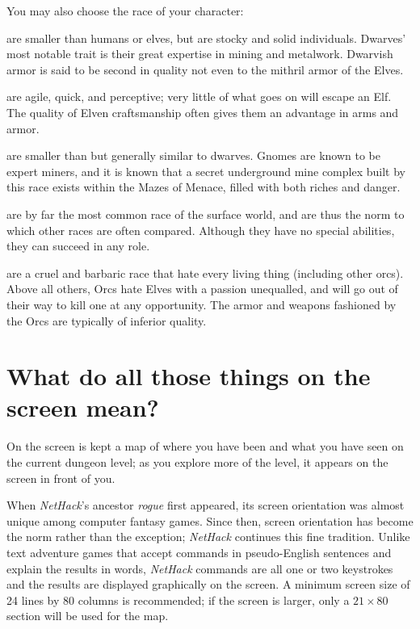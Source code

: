 You may also choose the race of your character:

%
\blist{}
\item[\bb{Dwarves}]%
are smaller than humans or elves, but are stocky and solid
individuals.  Dwarves' most notable trait is their great expertise in mining
and metalwork.  Dwarvish armor is said to be second in quality not even to the
mithril armor of the Elves.
%
\item[\bb{Elves}]%
are agile, quick, and perceptive; very little of what goes
on will escape an Elf.  The quality of Elven craftsmanship often gives
them an advantage in arms and armor.
%
\item[\bb{Gnomes}]%
are smaller than but generally similar to dwarves.  Gnomes are
known to be expert miners, and it is known that a secret underground mine
complex built by this race exists within the Mazes of Menace, filled with
both riches and danger.
%
\item[\bb{Humans}]%
are by far the most common race of the surface world, and
are thus the norm to which other races are often compared.  Although
they have no special abilities, they can succeed in any role.
%
\item[\bb{Orcs}]%
are a cruel and barbaric race that hate every living thing
(including other orcs).  Above all others, Orcs hate Elves with a passion
unequalled, and will go out of their way to kill one at any opportunity.
The armor and weapons fashioned by the Orcs are typically of inferior quality.
\elist

\section{What do all those things on the screen mean?}
On the screen is kept a map of where you have been and what you have 
seen on the current dungeon level; as you explore more of the level, 
it appears on the screen in front of you.

When {\it NetHack\/}'s ancestor {\it rogue\/} first appeared, its screen
orientation was almost unique among computer fantasy games.  Since
then, screen orientation has become the norm rather than the
exception; {\it NetHack\/} continues this fine tradition.  Unlike text
adventure games that accept commands in pseudo-English sentences and
explain the results in words, {\it NetHack\/} commands are all one or two
keystrokes and the results are displayed graphically on the screen.  A
minimum screen size of 24 lines by 80 columns is recommended; if the
screen is larger, only a $21\times80$ section will be used for the map.


